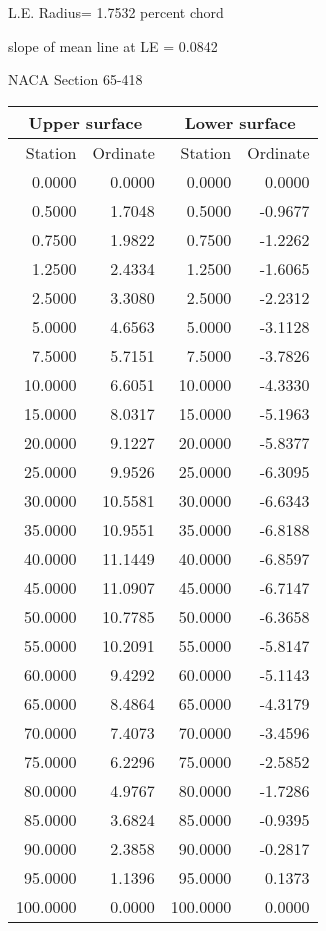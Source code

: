 \documentclass[11pt]{book}
\begin{document}
L.E. Radius=  1.7532 percent chord


 slope of mean line at LE =  0.0842
 \newpage
  \label{s65-418}
 \begin{Large}
 NACA Section 65-418
 \end{Large}
  
 \vspace{8mm}
 \begin{tabular}{|r|r|r|r|} \hline 
 \multicolumn{2}{|c|}{Upper surface} & \multicolumn{2}{|c|}{Lower surface} \\
 \hline
 Station & Ordinate & Station & Ordinate \\
 \hline
0.0000 & 0.0000 & 0.0000 & 0.0000 \\
0.5000 & 1.7048 & 0.5000 & -0.9677 \\
0.7500 & 1.9822 & 0.7500 & -1.2262 \\
1.2500 & 2.4334 & 1.2500 & -1.6065 \\
2.5000 & 3.3080 & 2.5000 & -2.2312 \\
5.0000 & 4.6563 & 5.0000 & -3.1128 \\
7.5000 & 5.7151 & 7.5000 & -3.7826 \\
10.0000 & 6.6051 & 10.0000 & -4.3330 \\
15.0000 & 8.0317 & 15.0000 & -5.1963 \\
20.0000 & 9.1227 & 20.0000 & -5.8377 \\
25.0000 & 9.9526 & 25.0000 & -6.3095 \\
30.0000 & 10.5581 & 30.0000 & -6.6343 \\
35.0000 & 10.9551 & 35.0000 & -6.8188 \\
40.0000 & 11.1449 & 40.0000 & -6.8597 \\
45.0000 & 11.0907 & 45.0000 & -6.7147 \\
50.0000 & 10.7785 & 50.0000 & -6.3658 \\
55.0000 & 10.2091 & 55.0000 & -5.8147 \\
60.0000 & 9.4292 & 60.0000 & -5.1143 \\
65.0000 & 8.4864 & 65.0000 & -4.3179 \\
70.0000 & 7.4073 & 70.0000 & -3.4596 \\
75.0000 & 6.2296 & 75.0000 & -2.5852 \\
80.0000 & 4.9767 & 80.0000 & -1.7286 \\
85.0000 & 3.6824 & 85.0000 & -0.9395 \\
90.0000 & 2.3858 & 90.0000 & -0.2817 \\
95.0000 & 1.1396 & 95.0000 & 0.1373 \\
100.0000 & 0.0000 & 100.0000 & 0.0000 \\
 \hline 
 \end{tabular}
\end{document}
